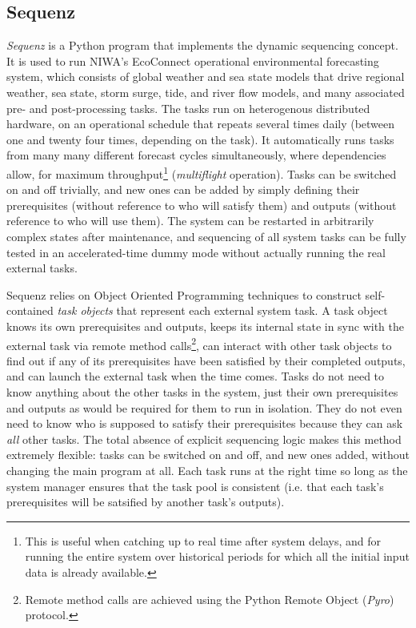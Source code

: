 \documentclass[11pt,a4paper]{article}
\begin{document}
\subsection{Sequenz}

{\em Sequenz} is a Python program that implements the dynamic sequencing
concept. It is used to run NIWA's EcoConnect operational environmental
forecasting system, which consists of global weather and sea state
models that drive regional weather, sea state, storm surge, tide, and
river flow models, and many associated pre- and post-processing tasks.
The tasks run on heterogenous distributed hardware, on an operational
schedule that repeats several times daily (between one and twenty four
times, depending on the task).  It automatically runs tasks from many
many different forecast cycles simultaneously, where dependencies allow,
for maximum throughput\footnote{This is useful when catching up to real
time after system delays, and for running the entire system over
historical periods for which all the initial input data is already
available.} ({\em multiflight} operation). Tasks can be switched on and
off trivially, and new ones can be added by simply defining their
prerequisites (without reference to who will satisfy them) and outputs
(without reference to who will use them). The system can be restarted in
arbitrarily complex states after maintenance, and sequencing of all
system tasks can be fully tested in an accelerated-time dummy mode
without actually running the real external tasks. 

Sequenz relies on Object Oriented Programming techniques to construct
self-contained {\em task objects} that represent each external system
task.  A task object knows its own prerequisites and outputs, keeps its
internal state in sync with the external task via remote method
calls\footnote{Remote method calls are achieved using the Python Remote
Object ({\em Pyro}) protocol.}, can interact with other task objects to
find out if any of its prerequisites have been satisfied by their
completed outputs, and can launch the external task when the time comes.
Tasks do not need to know anything about the other tasks in the system,
just their own prerequisites and outputs as would be required for them
to run in isolation. They do not even need to know who is supposed to
satisfy their prerequisites because they can ask {\em all} other tasks.
The total absence of explicit sequencing logic makes this method
extremely flexible: tasks can be switched on and off, and new ones
added, without changing the main program at all. Each task runs at the
right time so long as the system manager ensures that the task pool is
consistent (i.e. that each task's prerequisites will be satsified by
another task's outputs).
\end{document}
